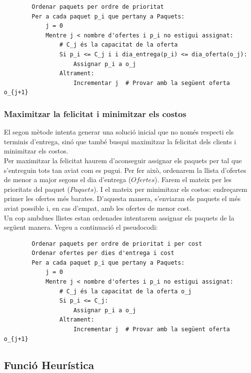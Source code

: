 \documentclass[a4paper]{article}
\begin{document}
	\begin{verbatim}
		Ordenar paquets per ordre de prioritat
		Per a cada paquet p_i que pertany a Paquets:
		    j = 0
		    Mentre j < nombre d'ofertes i p_i no estigui assignat:
		        # C_j és la capacitat de la oferta
		        Si p_i <= C_j i i dia_entrega(p_i) <= dia_oferta(o_j):
		            Assignar p_i a o_j
		        Altrament:
		            Incrementar j  # Provar amb la següent oferta o_{j+1}
	\end{verbatim}
	
	
	\subsubsection{Maximitzar la felicitat i minimitzar els costos}
	
	El segon mètode intenta generar una solució inicial que no només respecti els terminis d'entrega, sinó que també busqui maximitzar la felicitat dels clients i minimitzar els costos. \\
	
	Per maximitzar la felicitat haurem d'aconseguir assignar els paquets per tal que s'entreguin tots tan aviat com es pugui. Per fer això, ordenarem la llista d'ofertes de menor a major segons el dia d'entrega ($Ofertes$). Farem el mateix per les prioritats del paquet ($Paquets$). I el mateix per minimitzar els costos: endreçarem primer les ofertes més barates. D'aquesta manera, s'enviaran els paquets el més aviat possible i, en cas d'empat, amb les ofertes de menor cost. \\
	
	Un cop ambdues llistes estan ordenades intentarem assignar els paquets de la següent manera. Vegeu a continuació el pseudocodi: \\
	
	\begin{verbatim}
		Ordenar paquets per ordre de prioritat i per cost
		Ordenar ofertes per dies d'entrega i cost
		Per a cada paquet p_i que pertany a Paquets:
		    j = 0
		    Mentre j < nombre d'ofertes i p_i no estigui assignat:
		        # C_j és la capacitat de la oferta o_j
		        Si p_i <= C_j:
		            Assignar p_i a o_j
		        Altrament:
		            Incrementar j  # Provar amb la següent oferta o_{j+1}
	\end{verbatim}
		
	\subsection{Funció Heurística}
	
\end{document}
